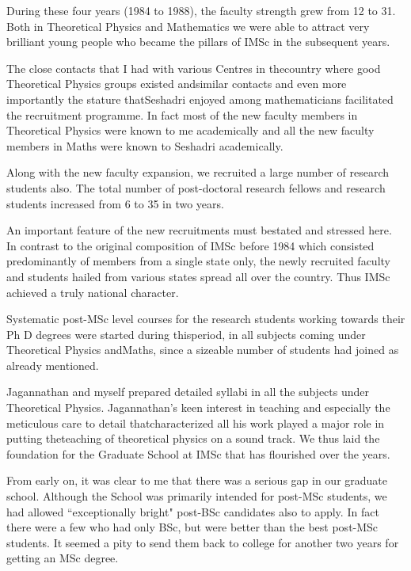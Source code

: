 During these four years (1984 to 1988), the faculty strength grew from 
12 to 31. Both in Theoretical Physics and Mathematics we were able to 
attract very brilliant young people who became the pillars of IMSc in 
the subsequent years.


The close contacts that I had with various Centres in the\break country where 
good Theoretical Physics groups existed and\break similar contacts and even 
more importantly the stature that\break Seshadri enjoyed among mathematicians 
facilitated the recruitment programme. In fact most of the new faculty 
members in Theoretical Physics were known to me academically and all the 
new faculty members in Maths were known to Seshadri academically.


Along with the new faculty expansion, we recruited a large number of 
research students also. The total number of post-doctoral research 
fellows and research students increased from 6 to 35 in two years.


An important feature of the new recruitments must be\break stated and stressed 
here. In contrast to the original composition of IMSc before 1984 which 
consisted predominantly of members from a single state only, the newly 
recruited faculty and students hailed from various states spread all 
over the country. Thus IMSc achieved a truly national character.
\smallskip

Systematic post-MSc level courses for the research students working 
towards their Ph D degrees were started during this\break period, in all 
subjects coming under Theoretical Physics and\break Maths, since a sizeable 
number of students had joined as already mentioned.
\smallskip

Jagannathan and myself prepared detailed syllabi in all the subjects 
under Theoretical Physics. Jagannathan's keen interest\- in teaching and 
especially the meticulous care to detail that\break characterized all his work 
played a major role in putting the\break teaching of theoretical physics on a 
sound track. We thus laid the foundation for the Graduate School at IMSc 
that has flouri\-shed over the years.
\smallskip

From early on, it was clear to me that there was a serious gap in our 
graduate school. Although the School was primarily intended for post-MSc 
students, we had allowed ``exceptionally bright" post-BSc candidates also 
to apply. In fact there were a few who had only BSc, but were better than 
the best post-MSc students. It seemed a pity to send them back to 
college for another two years for getting an MSc degree.
\smallskip

